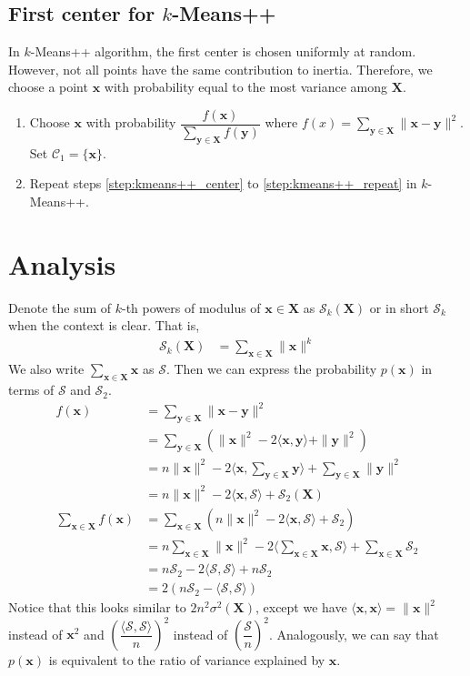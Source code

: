 \documentclass[twoside, 11pt]{article}
\newcommand{\x}{\mathbf{x}}
\newcommand{\X}{\mathbf{X}}
\newcommand{\y}{\mathbf{y}}
\newcommand{\C}{\mathcal{C}}
\renewcommand{\S}{\mathcal{S}}
\begin{document}
	\subsection{First center for $k$-Means++}
	In $k$-Means++ algorithm, the first center is chosen uniformly at random. However, not all points have the same contribution to inertia. Therefore, we choose a point $\x$ with probability equal to the most variance among $\X$.
		\begin{enumerate}[i]
			\item Choose $\x$ with probability $\dfrac{f(\x)}{\sum_{\y\in\X}f(\y)}$ where $f(x)=\sum_{\y\in\X}\|\x-\y\|^2$. Set $\C_1=\{\x\}$.
			\item Repeat steps \eqref{step:kmeans++_center} to \eqref{step:kmeans++_repeat} in $k$-Means++.
		\end{enumerate}
	\section{Analysis}
	Denote the sum of $k$-th powers of modulus of $\x\in\X$ as $\S_k(\X)$ or in short $\S_k$ when the context is clear. That is,
		\begin{align*}
			\S_k(\X) & = \sum_{\x\in\X}\|\x\|^k
		\end{align*}
	We also write $\sum_{\x\in\X}\x$ as $\S$. Then we can express the probability $p(\x)$ in terms of $\S$ and $\S_2$.
		\begin{align*}
			f(\x)	& = \sum_{\y\in\X}\|\x-\y\|^2\\
					& = \sum_{\y\in\X}\left(\|\x\|^2-2\langle\x,\y\rangle+\|\y\|^2\right)\\
					& = n\|\x\|^2-2\langle\x,\sum_{\y\in\X}\y\rangle+\sum_{\y\in\X}\|\y\|^2\\
					& = n\|\x\|^2-2\langle\x,\S\rangle+\S_2(\X)\\
			\sum_{\x\in\X}f(\x)
					& = \sum_{\x\in\X}\left(n\|\x\|^2-2\langle\x,\S\rangle+\S_2\right)\\
					& = n\sum_{\x\in\X}\|\x\|^2-2\langle\sum_{\x\in\X}\x,\S\rangle+\sum_{\x\in\X}\S_2\\
					& = n\S_2-2\langle\S,\S\rangle+n\S_2\\
					& = 2(n\S_2-\langle\S,\S\rangle)
		\end{align*}
	Notice that this looks similar to $2n^2\sigma^2(\X)$, except we have $\langle \x,\x\rangle=\|\x\|^2$ instead of $\x^2$ and $\left(\dfrac{\langle\S,\S\rangle}{n}\right)^2$ instead of $\left(\dfrac{\S}{n}\right)^2$. Analogously, we can say that $p(\x)$ is equivalent to the ratio of variance explained by $\x$.
	
\end{document}
